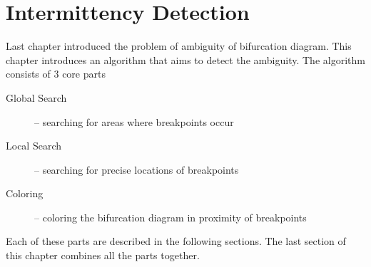 \chapter{Intermittency Detection}
Last chapter introduced the problem of ambiguity of bifurcation diagram.
This chapter introduces an algorithm that aims to detect the ambiguity.
The algorithm consists of 3 core parts

\begin{description}
	\item [Global Search] -- searching for areas where breakpoints occur
	\item [Local Search] -- searching for precise locations of breakpoints
	\item [Coloring] -- coloring the bifurcation diagram in proximity of breakpoints
\end{description}

Each of these parts are described in the following sections.
The last section of this chapter combines all the parts together.

